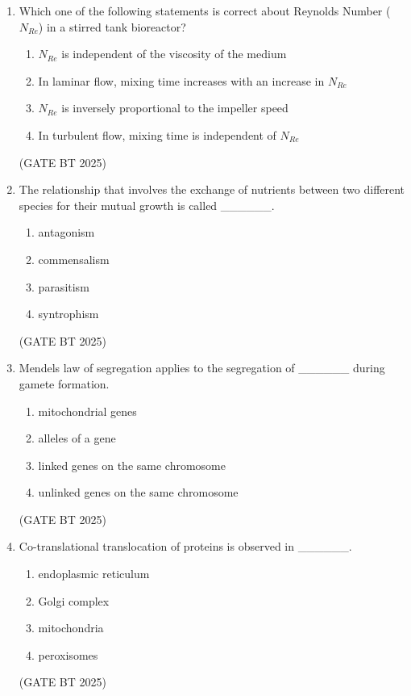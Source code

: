 \documentclass[journal,12pt,onecolumn]{IEEEtran}
\theoremstyle{remark}
\begin{document}
\begin{enumerate}
\item 
Which one of the following statements is correct about Reynolds Number ($N_{Re}$) in a stirred tank bioreactor?

\begin{enumerate}
    \item $N_{Re}$ is independent of the viscosity of the medium
    \item In laminar flow, mixing time increases with an increase in $N_{Re}$
    \item $N_{Re}$ is inversely proportional to the impeller speed
    \item In turbulent flow, mixing time is independent of $N_{Re}$
\end{enumerate}
\hfill(GATE BT 2025)

\item 
The relationship that involves the exchange of nutrients between two different species for their mutual growth is called \_\_\_\_\_\_.

\begin{enumerate}
    \item antagonism
    \item commensalism
    \item parasitism
    \item syntrophism
\end{enumerate}
\hfill(GATE BT 2025)

\item 
Mendels law of segregation applies to the segregation of \_\_\_\_\_\_ during gamete formation.

\begin{enumerate}
    \item mitochondrial genes
    \item alleles of a gene
    \item linked genes on the same chromosome
    \item unlinked genes on the same chromosome
\end{enumerate}
\hfill(GATE BT 2025)

\item 
Co-translational translocation of proteins is observed in \_\_\_\_\_\_.

\begin{enumerate}
    \item endoplasmic reticulum
    \item Golgi complex
    \item mitochondria
    \item peroxisomes
\end{enumerate}
\hfill(GATE BT 2025)


\end{enumerate}
\end{document}
